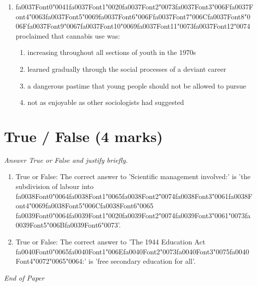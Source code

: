 \documentclass[12pt]{article}
\begin{document}
\begin{enumerate}[label=\arabic*.]
\begin{enumerate}[label=(\alph*)]
    \item all of the above
\end{enumerate}
\item {\csname fa0037Font0\endcsname\char"0041}{\csname fa0037Font1\endcsname\char"0020}{\csname fa0037Font2\endcsname\char"0073}{\csname fa0037Font3\endcsname\char"006F}{\csname fa0037Font4\endcsname\char"0063}{\csname fa0037Font5\endcsname\char"0069}{\csname fa0037Font6\endcsname\char"006F}{\csname fa0037Font7\endcsname\char"006C}{\csname fa0037Font8\endcsname\char"006F}{\csname fa0037Font9\endcsname\char"0067}{\csname fa0037Font10\endcsname\char"0069}{\csname fa0037Font11\endcsname\char"0073}{\csname fa0037Font12\endcsname\char"0074} proclaimed that cannabis use was:
\begin{enumerate}[label=(\alph*)]
    \item increasing throughout all sections of youth in the 1970s
    \item learned gradually through the social processes of a deviant career
    \item a dangerous pastime that young people should not be allowed to pursue
    \item not as enjoyable as other sociologists had suggested
\end{enumerate}
\end{enumerate}

\section*{True / False (4 marks)}
\textit{Answer True or False and justify briefly.}
\begin{enumerate}[label=\arabic*.]
\item True or False: The correct answer to 'Scientific management involved:' is 'the subdivision of labour into {\csname fa0038Font0\endcsname\char"0064}{\csname fa0038Font1\endcsname\char"0065}{\csname fa0038Font2\endcsname\char"0074}{\csname fa0038Font3\endcsname\char"0061}{\csname fa0038Font4\endcsname\char"0069}{\csname fa0038Font5\endcsname\char"006C}{\csname fa0038Font6\endcsname\char"0065} {\csname fa0039Font0\endcsname\char"0064}{\csname fa0039Font1\endcsname\char"0020}{\csname fa0039Font2\endcsname\char"0074}{\csname fa0039Font3\endcsname\char"0061}{\char"0073}{\csname fa0039Font5\endcsname\char"006B}{\csname fa0039Font6\endcsname\char"0073}'.
\item True or False: The correct answer to 'The 1944 Education Act {\csname fa0040Font0\endcsname\char"0065}{\csname fa0040Font1\endcsname\char"006E}{\csname fa0040Font2\endcsname\char"0073}{\csname fa0040Font3\endcsname\char"0075}{\csname fa0040Font4\endcsname\char"0072}{\char"0065}{\char"0064}:' is 'free secondary education for all'.
\end{enumerate}

\vfill
\noindent\textit{End of Paper}
\end{document}
